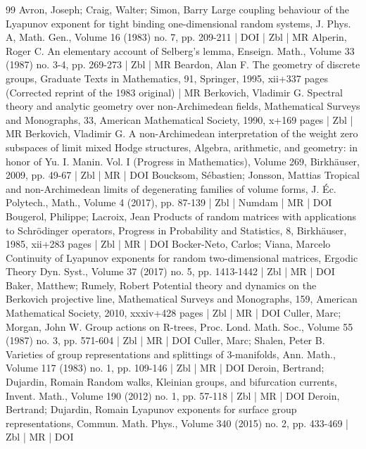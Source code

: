 \begin{thebibliography}{99}
Avron, Joseph; Craig, Walter; Simon, Barry Large coupling behaviour of the Lyapunov exponent for tight binding one-dimensional random systems, J. Phys. A, Math. Gen., Volume 16 (1983) no. 7, pp. 209-211 | DOI | Zbl | MR
Alperin, Roger C. An elementary account of Selberg’s lemma, Enseign. Math., Volume 33 (1987) no. 3-4, pp. 269-273 | Zbl | MR
Beardon, Alan F. The geometry of discrete groups, Graduate Texts in Mathematics, 91, Springer, 1995, xii+337 pages (Corrected reprint of the 1983 original) | MR
Berkovich, Vladimir G. Spectral theory and analytic geometry over non-Archimedean fields, Mathematical Surveys and Monographs, 33, American Mathematical Society, 1990, x+169 pages | Zbl | MR
Berkovich, Vladimir G. A non-Archimedean interpretation of the weight zero subspaces of limit mixed Hodge structures, Algebra, arithmetic, and geometry: in honor of Yu. I. Manin. Vol. I (Progress in Mathematics), Volume 269, Birkhäuser, 2009, pp. 49-67 | Zbl | MR | DOI
Boucksom, Sébastien; Jonsson, Mattias Tropical and non-Archimedean limits of degenerating families of volume forms, J. Éc. Polytech., Math., Volume 4 (2017), pp. 87-139 | Zbl | Numdam | MR | DOI
Bougerol, Philippe; Lacroix, Jean Products of random matrices with applications to Schrödinger operators, Progress in Probability and Statistics, 8, Birkhäuser, 1985, xii+283 pages | Zbl | MR | DOI
Bocker-Neto, Carlos; Viana, Marcelo Continuity of Lyapunov exponents for random two-dimensional matrices, Ergodic Theory Dyn. Syst., Volume 37 (2017) no. 5, pp. 1413-1442 | Zbl | MR | DOI
Baker, Matthew; Rumely, Robert Potential theory and dynamics on the Berkovich projective line, Mathematical Surveys and Monographs, 159, American Mathematical Society, 2010, xxxiv+428 pages | Zbl | MR | DOI
Culler, Marc; Morgan, John W. Group actions on R-trees, Proc. Lond. Math. Soc., Volume 55 (1987) no. 3, pp. 571-604 | Zbl | MR | DOI
Culler, Marc; Shalen, Peter B. Varieties of group representations and splittings of 3-manifolds, Ann. Math., Volume 117 (1983) no. 1, pp. 109-146 | Zbl | MR | DOI
Deroin, Bertrand; Dujardin, Romain Random walks, Kleinian groups, and bifurcation currents, Invent. Math., Volume 190 (2012) no. 1, pp. 57-118 | Zbl | MR | DOI
Deroin, Bertrand; Dujardin, Romain Lyapunov exponents for surface group representations, Commun. Math. Phys., Volume 340 (2015) no. 2, pp. 433-469 | Zbl | MR | DOI

\end{thebibliography}
